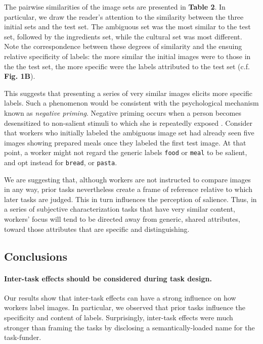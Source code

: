 \documentclass[letterpaper]{article}
\begin{document}
The pairwise similarities of the image sets are presented in \textbf{Table 2}. 
In particular, we draw the reader's attention to the similarity between the 
three initial sets and the test set.  The ambiguous set was the most similar 
to the test set, followed by the
ingredients set, while the cultural set was most different.
Note the correspondence between these degrees of similarity and the ensuing 
relative specificity of labels: the more similar the 
initial images were to those in the the test set, the more 
specific were the labels attributed to the test set  (c.f. \textbf{Fig. 1B}).  

This suggests that presenting a series of very similar images elicits more 
specific labels.
Such a phenomenon would be consistent with the psychological mechanism known 
as \textit{negative priming}.  Negative priming occurs when a person becomes 
desensitized to non-salient stimuli to which she is repeatedly 
exposed \cite{versace2001negative,mayr2007negative,de2008negative}.  Consider that workers who initially 
labeled the ambiguous image set had already seen five images showing 
prepared meals once they labeled the first test image.  At that point,
a worker might not regard the generic labels \texttt{food} or \texttt{meal} 
to be salient, and opt instead for \texttt{bread}, or \texttt{pasta}.

We are suggesting that, although workers are not instructed to compare
images in any way, prior tasks nevertheless create a frame of reference
relative to which later tasks are judged.  This in turn 
influences the perception of salience. Thus, in a series of subjective 
characterization tasks that have very similar content, workers' focus 
will tend to be directed away from generic, shared attributes, toward those 
attributes that are specific and distinguishing.
\subsection*{Conclusions}
\paragraph{Inter-task effects should be considered during task design.}  
Our results show that inter-task effects can have a strong influence on how
workers label images.  In particular, we observed that prior tasks influence
the specificity and content of labels.  Surprisingly, inter-task effects were 
much stronger than framing the tasks by disclosing a semantically-loaded 
name for the task-funder. 
\end{document}

